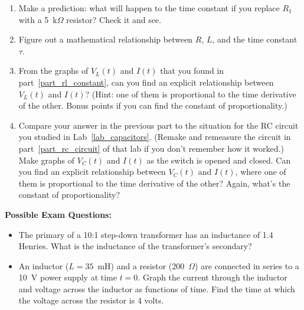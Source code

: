 \begin{enumerate}[wide]
\item Make a prediction: what will happen to the time constant if you replace $R_1$ with a 5~k$\Omega$ resistor?  Check it and see.

\item Figure out a mathematical relationship between $R$, $L$, and the time constant $\tau$.

\item From the graphs of $V_{L}(t)$ and $I(t)$ that you found in part~\ref{part_rl_constant}, can you find an explicit relationship between  $V_{L}(t)$ and $I(t)$?  (Hint: one of them is proportional to the time derivative of the other.  Bonus points if you can find the constant of proportionality.)

\item Compare your answer in the previous part to the situation for the RC circuit you studied in Lab~\ref{lab_capacitors}.  (Remake and remeasure the circuit in part~\ref{part_rc_circuit} of that lab if you don't remember how it worked.)  Make graphs of $V_{C}(t)$ and $I(t)$ as the switch is opened and closed.  Can you find an explicit relationship between $V_{C}(t)$ and $I(t)$, where one of them is proportional to the time derivative of the other?  Again, what's the constant of proportionality?


\end{enumerate}

\textbf{Possible Exam Questions:}

\begin{itemize}
\item The primary of a 10:1 step-down transformer has an inductance of 1.4 Henries.  What is the inductance of the transformer's secondary?

\item An inductor ($L = 35$~mH) and a resistor (200~$\Omega$) are connected in series to a 10~V power supply at time $t = 0$.  Graph the current through the inductor and voltage across the inductor as functions of time.  Find the time at which the voltage across the resistor is 4 volts.

\end{itemize}






